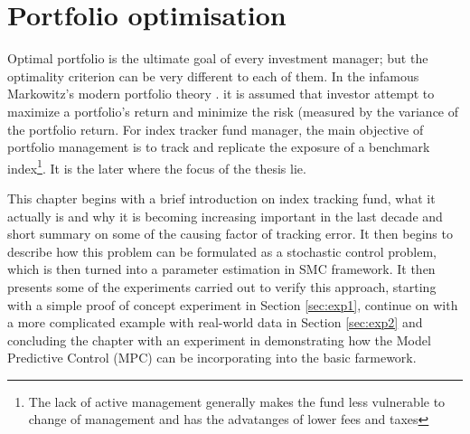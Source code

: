 \chapter{Portfolio optimisation}
\graphicspath{{Chapter4/figures/}}
\label{lab:PO}
Optimal portfolio is the ultimate goal of every investment manager; but the optimality criterion can be very different to each of them. In the infamous Markowitz's modern portfolio theory \cite{HM52}. it is assumed that investor attempt to maximize a portfolio's return and minimize the risk (measured by the variance of the portfolio return. For index tracker fund manager, the main objective of portfolio management is to track and replicate the exposure of a benchmark index\footnote{The lack of active management generally makes the fund less vulnerable to change of management and has the advatanges of lower fees and taxes}. It is the later where the focus of the thesis lie.
 
This chapter begins with a brief introduction on index tracking fund, what it actually is and why it is becoming increasing important in the last decade and short summary on some of the causing factor of tracking error. It then begins to describe how this problem can be formulated as a stochastic control problem, which is then turned into a parameter estimation in SMC framework. It then presents some of the experiments carried out to verify this approach, starting with a simple proof of concept experiment in Section \ref{sec:exp1}, continue on with a more complicated example with real-world data in Section \ref{sec:exp2} and concluding the chapter with an experiment in demonstrating how the Model Predictive Control (MPC) can be incorporating into the basic farmework.
 
 

